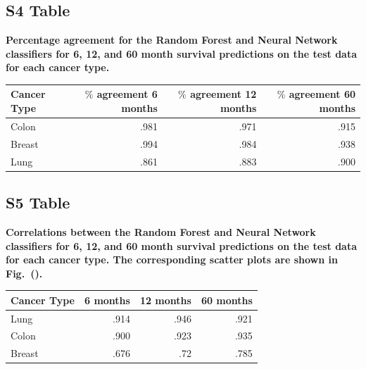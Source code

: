 \documentclass[10pt,letterpaper]{article}
\begin{document}
\subsection*{S4 Table}
\label{S4_Table}
{\bf Percentage agreement for the Random Forest and Neural Network classifiers for 6, 12, and 60 month survival predictions on the test data for each cancer type.}
\begin{table}[!ht]
\begin{adjustwidth}{-2.25in}{0in} %
\begin{tabular}{lrrr}
\toprule
Cancer Type & $\%$ agreement 6 months & $\%$ agreement 12 months & $\%$ agreement 60 months \\ 
\midrule
Colon & .981 & .971 & .915 \\  
Breast & .994 & .984 & .938 \\  
Lung & .861 & .883 & .900 \\  
\bottomrule
\end{tabular}
\end{adjustwidth}
\end{table}


\subsection*{S5 Table}
\label{S5_Table}
{\bf Correlations between the Random Forest and Neural Network classifiers for 6, 12, and 60 month survival predictions on the test data for each cancer type. The corresponding scatter plots are shown in Fig.~().}
\begin{table}[!ht]
\begin{adjustwidth}{-2.25in}{0in} %
\begin{tabular}{lrrr}
\toprule
Cancer Type &  6 months &  12 months &   60 months \\ 
\midrule
Lung & .914 & .946 & .921 \\  
Colon & .900 & .923 & .935 \\  
Breast & .676 & .72 & .785 \\  
\bottomrule
\end{tabular}
\end{adjustwidth}
\end{table}
\end{document}

